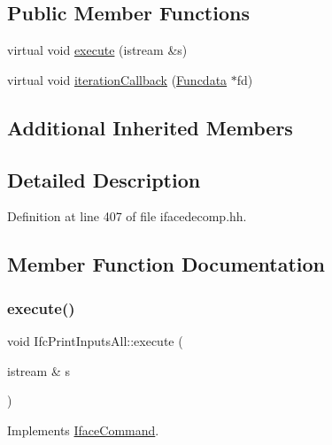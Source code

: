 \subsection*{Public Member Functions}
\begin{DoxyCompactItemize}
\item 
virtual void \mbox{\hyperlink{class_ifc_print_inputs_all_aaf763e010c0f82c94d95d9443fbe6f2c}{execute}} (istream \&s)
\item 
virtual void \mbox{\hyperlink{class_ifc_print_inputs_all_af1ed619938898b1dd91be98c256a7512}{iteration\+Callback}} (\mbox{\hyperlink{class_funcdata}{Funcdata}} $\ast$fd)
\end{DoxyCompactItemize}
\subsection*{Additional Inherited Members}


\subsection{Detailed Description}


Definition at line 407 of file ifacedecomp.\+hh.



\subsection{Member Function Documentation}
\mbox{\label{class_ifc_print_inputs_all_aaf763e010c0f82c94d95d9443fbe6f2c}} 
\subsubsection{\texorpdfstring{execute()}{execute()}}
{\footnotesize\ttfamily void Ifc\+Print\+Inputs\+All\+::execute (\begin{DoxyParamCaption}\item[{istream \&}]{s }\end{DoxyParamCaption})\hspace{0.3cm}{\ttfamily [virtual]}}



Implements \mbox{\hyperlink{class_iface_command_af10e29cee2c8e419de6efe9e680ad201}{Iface\+Command}}.



